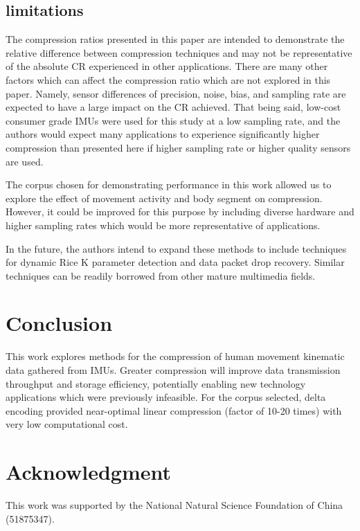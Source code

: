 \documentclass[journal]{IEEEtran}
\begin{document}
\subsection{limitations}

The compression ratios presented in this paper are intended to demonstrate the relative difference between compression techniques and may not be representative of the absolute CR experienced in other applications. There are many other factors which can affect the compression ratio which are not explored in this paper. Namely, sensor differences of precision, noise, bias, and sampling rate are expected to have a large impact on the CR achieved. That being said, low-cost consumer grade IMUs were used for this study at a low sampling rate, and the authors would expect many applications to experience significantly higher compression than presented here if higher sampling rate or higher quality sensors are used.

The corpus chosen for demonstrating performance in this work allowed us to explore the effect of movement activity and body segment on compression. However, it could be improved for this purpose by including diverse hardware and higher sampling rates which would be more representative of applications.

In the future, the authors intend to expand these methods to include techniques for dynamic Rice K parameter detection and data packet drop recovery. Similar techniques can be readily borrowed from other mature multimedia fields.

\section{Conclusion}
This work explores methods for the compression of human movement kinematic data gathered from IMUs. Greater compression will improve data transmission throughput and storage efficiency, potentially enabling new technology applications which were previously infeasible. For the corpus selected, delta encoding provided near-optimal linear compression (factor of 10-20 times) with very low computational cost.

\section*{Acknowledgment}
This work was supported by the National Natural Science
Foundation of China (51875347).

{}

\end{document}

